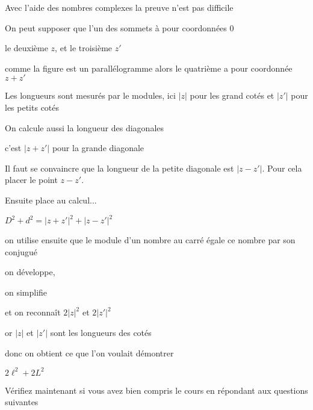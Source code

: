 \diapo


Avec l'aide des nombres complexes la preuve n'est pas difficile

On peut supposer que l'un des sommets à pour coordonnées $0$

le deuxième $z$, et le troisième $z'$

comme la figure est un parallélogramme alors le quatrième a pour
coordonnée $z+z'$

Les longueurs sont mesurés par le modules, ici $|z|$
pour les grand cotés et $|z'|$ pour les petits cotés

\change

On calcule aussi la longueur des diagonales

c'est $|z+z'|$ pour la grande diagonale

Il faut se convaincre que la longueur de la petite diagonale est
$|z-z'|$. Pour cela placer le point $z-z'$.

\change

Ensuite place au calcul...

$D^2 + d^2 = \left| z + z' \right|^2 + \left| z - z' \right|^2$

\change

on utilise ensuite que le module d'un nombre au carré égale ce nombre par son conjugué

\change

on développe, 

\change

on simplifie 

\change 

et on reconnaît $2 \left| z \right|^2$ et $2 \left|    z' \right|^2$

\change

or $|z|$ et $|z'|$ sont les longueurs des cotés

donc on obtient ce que l'on voulait démontrer

$2\ell^2+2L^2$



\diapo

Vérifiez maintenant si vous avez bien compris le cours en répondant aux questions suivantes

